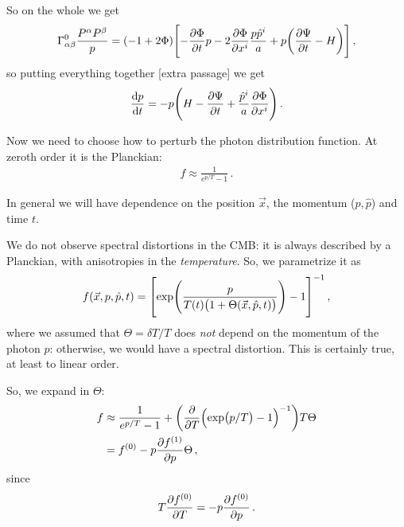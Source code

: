 \documentclass[main.tex]{subfiles}
\begin{document}
So on the whole we get 
%
\begin{align}
\Gamma^{0}_{\alpha \beta } \frac{P^{\alpha } P^{\beta }}{p } = 
(-1 + 2 \Phi ) \qty[
- \pdv{\Phi }{t} p - 2 \pdv{\Phi }{x^{i}}
\frac{p \hat{p}^{i}}{a} + p \qty(\pdv{\Psi }{t} - H)
]
\,,
\end{align}
%
so putting everything together 
[extra passage]
we get 
%
\begin{align}
\dv{p}{t} = -p \qty(H - \pdv{\Psi }{t} + \frac{\hat{p}^{i}}{a} \pdv{\Phi }{x^{i}})
\,.
\end{align}

Now we need to choose how to perturb the photon distribution function. At zeroth order it is the Planckian: 
%
\begin{align}
f \approx \frac{1}{e^{p/T} - 1} 
\,.
\end{align}

In general we will have dependence on the position \(\vec{x}\), the momentum (\(p, \hat{p}\)) and time \(t\). 

We do not observe spectral distortions in the CMB: it is always described by a Planckian, with anisotropies in the \emph{temperature}. So, we parametrize it as 
%
\begin{align}
f(\vec{x}, p, \hat{p}, t) 
= \qty[\exp(\frac{p}{T(t) \qty(1 + \Theta (\vec{x}, \hat{p}, t))}) - 1]^{-1}
\,,
\end{align}
%
where we assumed that \(\Theta = \delta T / T\) does \emph{not} depend on the momentum of the photon \(p\): otherwise, we would have a spectral distortion. 
This is certainly true, at least to linear order. 

So, we expand in \(\Theta\): 
%
\begin{subequations}
\begin{align}
f &\approx \frac{1}{e^{p/T}-1}
 + \qty(\pdv{}{T} \qty(\exp(p/T)-1)^{-1}) T \Theta  \\
 &= f^{(0)} - p \pdv{f^{(1)}}{p} \Theta 
\,,
\end{align}
\end{subequations}
%
since 
%
\begin{align}
T \pdv{f^{(0)}}{T} = - p \pdv{f^{(0)}}{p}
\,.
\end{align}
\end{document}

